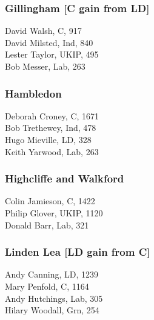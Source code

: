 \documentclass[a4paper,openany,10pt]{book}
\begin{document}
\subsubsection*{Gillingham \hspace*{\fill}\nolinebreak[1]%
\enspace\hspace*{\fill}
[C gain from LD]}



David Walsh, C, 917\\
David Milsted, Ind, 840\\
Lester Taylor, UKIP, 495\\
Bob Messer, Lab, 263\\


\subsubsection*{Hambledon}



Deborah Croney, C, 1671\\
Bob Trethewey, Ind, 478\\
Hugo Mieville, LD, 328\\
Keith Yarwood, Lab, 263\\


\subsubsection*{Highcliffe and Walkford}



Colin Jamieson, C, 1422\\
Philip Glover, UKIP, 1120\\
Donald Barr, Lab, 321\\


\subsubsection*{Linden Lea \hspace*{\fill}\nolinebreak[1]%
\enspace\hspace*{\fill}
[LD gain from C]}



Andy Canning, LD, 1239\\
Mary Penfold, C, 1164\\
Andy Hutchings, Lab, 305\\
Hilary Woodall, Grn, 254\\
\end{document}
